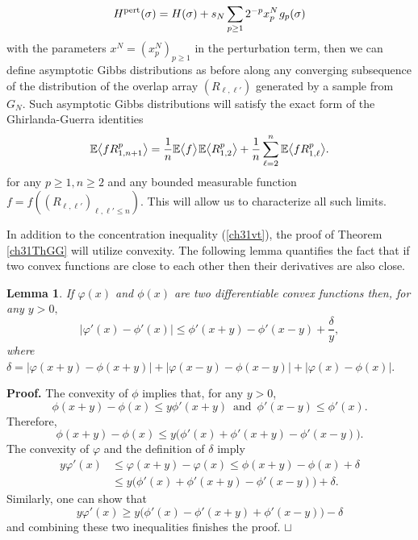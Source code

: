 \documentclass[12pt]{article}
\newcommand{\smsp}{\hspace{0.3mm}}
\newcommand{\e}{\mathbb{E}}
\newcommand{\la}{\langle}
\newcommand{\ra}{\rangle}
\newcommand\qed{\hfill\hbox{\rlap{$\sqcap$}$\sqcup$}}
\newtheorem{lemma}{Lemma}
\theoremstyle{nonumberplain}
\begin{document}
\begin{equation}
H^{\mathrm{pert}}(\sigma) = H(\sigma) + s_N  \sum_{p\geq 1} 2^{-p} x_p^N \smsp g_{p}(\sigma)
\label{ch31HpertNN}
\end{equation} 
with the parameters $x^N = (x_p^N)_{p\geq 1}$ in the perturbation term, then we can define asymptotic Gibbs distributions as before along any converging subsequence of the distribution of the overlap array $(R_{\ell,\ell'})$ generated by a sample from $G_N.$ Such asymptotic Gibbs distributions will satisfy the exact form of the Ghirlanda-Guerra identities
\begin{equation}
\e  \bigl\la f R_{1,n+1}^p \bigr\ra =  \frac{1}{n}\e \bigl\la f \bigr\ra \smsp \e\bigl\la R_{1,2}^p\bigr\ra + \frac{1}{n}\sum_{\ell=2}^{n}\e \bigl\la f R_{1,\ell}^p\bigr\ra.
\label{ch31GGlimit}
\end{equation}
for any $p\geq 1, n\geq 2$ and any bounded measurable function $f=f((R_{\ell,\ell'})_{\ell,\ell'\leq n}).$ This will allow us to characterize all such limits.

In addition to the concentration inequality (\ref{ch31vt}), the proof of Theorem \ref{ch31ThGG} will utilize convexity. The following lemma quantifies the fact that if two convex functions are close to each other then their derivatives are also close. 
\begin{lemma}
If $\varphi(x)$ and $\phi(x)$ are two differentiable convex functions then, for any $y>0,$
\begin{equation}
|\varphi'(x)-\phi'(x)|
\leq 
\phi'(x+y) -\phi'(x-y) + \frac{\delta}{y}, 
\label{ch31conv}
\end{equation}
where 
$
\delta =|\varphi(x+y)-\phi(x+y)|+|\varphi(x-y)-\phi(x-y)| 
+ |\varphi(x) - \phi(x)|.
$
\end{lemma}
\noindent\textbf{Proof.}
The convexity of $\phi$ implies that, for any $y>0$,
$$
\phi(x+y)-\phi(x)\leq y\phi'(x+y) 
\,\mbox{ and }\,
\phi'(x-y) \leq \phi'(x).
$$
Therefore,
$$
 \phi(x+y)-\phi(x)\leq y\bigl( \phi'(x) + \phi'(x+y) -\phi'(x-y) \bigr). 
 $$
The convexity of $\varphi$ and the definition of $\delta$ imply
\begin{align*}
y \varphi'(x)
&\leq 
\varphi(x+y)-\varphi(x)
\leq
\phi(x+y)-\phi(x)+\delta
\\
&\leq
y\bigl( \phi'(x) + \phi'(x+y) -\phi'(x-y)\bigr) +\delta.
\end{align*}
Similarly, one can show that
$$
y \varphi'(x)\geq
y\bigl( \phi'(x) - \phi'(x+y) + \phi'(x-y)\bigr)-\delta
$$
and combining these two inequalities finishes the proof.
\qed
\end{document}
